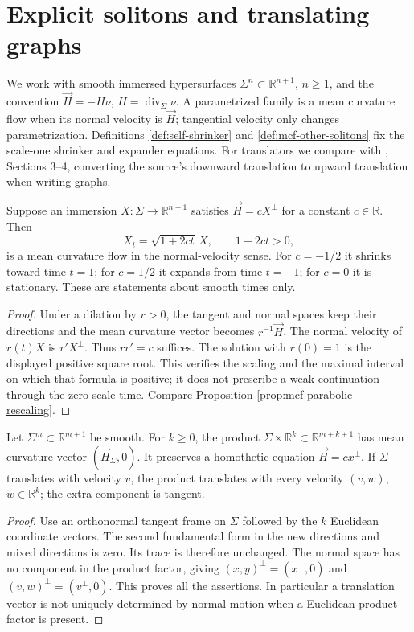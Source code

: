 \chapter{Explicit solitons and translating graphs}\label{sec:examples-solitons}
We work with smooth immersed hypersurfaces $\Sigma^n\subset\mathbb R^{n+1}$, $n\geq1$, and the convention $\vec H=-H\nu$, $H=\operatorname{div}_\Sigma\nu$. A parametrized family is a mean curvature flow when its normal velocity is $\vec H$; tangential velocity only changes parametrization. Definitions \ref{def:self-shrinker} and \ref{def:mcf-other-solitons} fix the scale-one shrinker and expander equations. For translators we compare with \cite{HIMW19}, Sections 3--4, converting the source's downward translation to upward translation when writing graphs.

\begin{proposition}\label{prop:example-homothetic-clock}
Suppose an immersion $X:\Sigma\to\mathbb R^{n+1}$ satisfies $\vec H=cX^\perp$ for a constant $c\in\mathbb R$. Then
\[
 X_t=\sqrt{1+2ct}\,X,\qquad 1+2ct>0,
\]
is a mean curvature flow in the normal-velocity sense. For $c=-1/2$ it shrinks toward time $t=1$; for $c=1/2$ it expands from time $t=-1$; for $c=0$ it is stationary. These are statements about smooth times only.
\end{proposition}
\begin{proof}
Under a dilation by $r>0$, the tangent and normal spaces keep their directions and the mean curvature vector becomes $r^{-1}\vec H$. The normal velocity of $r(t)X$ is $r'X^\perp$. Thus $rr'=c$ suffices. The solution with $r(0)=1$ is the displayed positive square root. This verifies the scaling and the maximal interval on which that formula is positive; it does not prescribe a weak continuation through the zero-scale time. Compare Proposition \ref{prop:mcf-parabolic-rescaling}.
\end{proof}

\begin{proposition}\label{prop:example-soliton-product}
Let $\Sigma^m\subset\mathbb R^{m+1}$ be smooth. For $k\geq0$, the product $\Sigma\times\mathbb R^k\subset\mathbb R^{m+k+1}$ has mean curvature vector $(\vec H_\Sigma,0)$. It preserves a homothetic equation $\vec H=cx^\perp$. If $\Sigma$ translates with velocity $v$, the product translates with every velocity $(v,w)$, $w\in\mathbb R^k$; the extra component is tangent.
\end{proposition}
\begin{proof}
Use an orthonormal tangent frame on $\Sigma$ followed by the $k$ Euclidean coordinate vectors. The second fundamental form in the new directions and mixed directions is zero. Its trace is therefore unchanged. The normal space has no component in the product factor, giving $(x,y)^\perp=(x^\perp,0)$ and $(v,w)^\perp=(v^\perp,0)$. This proves all the assertions. In particular a translation vector is not uniquely determined by normal motion when a Euclidean product factor is present.
\end{proof}

